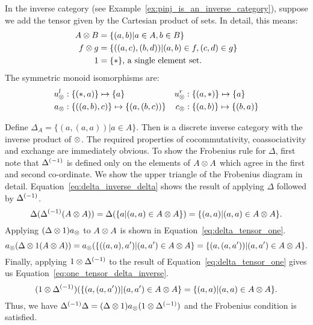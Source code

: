 \begin{example}\label{ex:pinj_is_a_discrete_inverse_category}
  In the inverse category \pinj (see Example~\ref{ex:pinj_is_an_inverse_category}), suppose we add
  the tensor given by the Cartesian product of sets. In detail, this means:
  \begin{align*}
    A \otimes B &= \{(a,b)| a\in A, b\in B\}\\
    f \otimes g &= \{((a,c),(b,d)) | (a,b) \in f, (c,d) \in g\}\\
    1 & = \{*\}\text{, a single element set.}
  \end{align*}
  The symmetric monoid isomorphisms are:
    \begin{align*}
      u_{\otimes}^l &: \{(*,a)\} \mapsto \{a\}
      &u_{\otimes}^r &: \{(a,*)\} \mapsto \{a\}\\
      a_{\otimes} &: \{((a,b),c)\} \mapsto \{(a,(b,c))\}
      &c_{\otimes} &: \{(a,b)\} \mapsto \{(b,a)\}
    \end{align*}

  Define $\Delta_A = \{(a,(a,a)) | a\in A\}$. Then \pinj is a discrete inverse category with the
  inverse product of $\otimes$. The required properties of cocommutativity, coassociativity and
  exchange are immediately obvious. To show the Frobenius rule for $\Delta$, first note that
  ${\Delta}^{(-1)}$ is defined only on the elements of $A\otimes A$ which agree in the first and second
  co-ordinate. We show the upper triangle of the Frobenius diagram in
  detail. Equation~\ref{eq:delta_inverse_delta} shows the result of applying $\Delta$ followed by
  ${\Delta}^{(-1)}$.
  \begin{equation}
    \Delta({\Delta}^{(-1)}(A\otimes A)) = \Delta(\{a | (a,a) \in A\otimes A\})
    = \{(a,a) | (a,a) \in A\otimes A\}.\label{eq:delta_inverse_delta}
  \end{equation}
  Applying $(\Delta \otimes 1)a_{\otimes}$ to $A\otimes A$ is shown in Equation~\ref{eq:delta_tensor_one}.
  \begin{equation}
    a_{\otimes}(\Delta\otimes1(A\otimes A)) = a_{\otimes}(\{((a,a),a') | (a,a') \in A\otimes A\} = \{(a,(a,a')) | (a,a') \in
    A\otimes A\}.\label{eq:delta_tensor_one}
  \end{equation}
  Finally, applying $1 \otimes {\Delta}^{(-1)}$ to the result of Equation~\ref{eq:delta_tensor_one} gives us
  Equation~\ref{eq:one_tensor_delta_inverse}.
  \begin{equation}
    (1\otimes{\Delta}^{(-1)})(\{(a,(a,a')) | (a,a') \in  A\otimes A\} = \{(a,a) | (a,a) \in A\otimes A\} \label{eq:one_tensor_delta_inverse}.
  \end{equation}
  Thus, we have ${\Delta}^{(-1)}\Delta = (\Delta \otimes 1) a_{\otimes} (1\otimes{\Delta}^{(-1)})$ and the Frobenius
  condition is satisfied.
\end{example}


